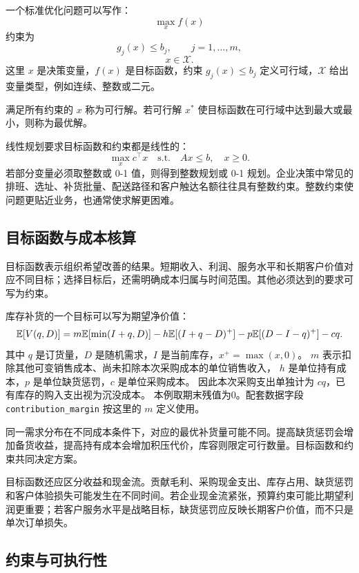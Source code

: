 一个标准优化问题可以写作：
\[
  \max_{x} f(x)
\]
约束为
\[
  g_j(x)\le b_j,\qquad j=1,\ldots,m,
\]
\[
  x\in\mathcal X.
\]
这里 \(x\) 是决策变量，\(f(x)\) 是目标函数，约束 \(g_j(x)\le b_j\) 定义可行域，\(\mathcal X\) 给出变量类型，例如连续、整数或二元。

\begin{definition}[可行解与最优解]
满足所有约束的 \(x\) 称为可行解。若可行解 \(x^*\) 使目标函数在可行域中达到最大或最小，则称为最优解。
\end{definition}

线性规划要求目标函数和约束都是线性的：
\[
  \max_x c^\top x
  \quad
  \text{s.t.}
  \quad
  Ax\le b,\quad x\ge 0.
\]
若部分变量必须取整数或 0-1 值，则得到整数规划或 0-1 规划。企业决策中常见的排班、选址、补货批量、配送路径和客户触达名额往往具有整数约束。整数约束使问题更贴近业务，也通常使求解更困难。

\subsection{目标函数与成本核算}

目标函数表示组织希望改善的结果。短期收入、利润、服务水平和长期客户价值对应不同目标；选择目标后，还需明确成本归属与时间范围。其他必须达到的要求可写为约束。

库存补货的一个目标可以写为期望净价值：
\[
  \mathbb E[V(q,D)]
  =
  m\mathbb E[\min(I+q,D)]
  -
  h\mathbb E[(I+q-D)^+]
  -
  p\mathbb E[(D-I-q)^+]
  -
  cq.
\]
其中 \(q\) 是订货量，\(D\) 是随机需求，\(I\) 是当前库存，\(x^+=\max(x,0)\)。
\(m\) 表示扣除其他可变销售成本、尚未扣除本次采购成本的单位销售收入，
\(h\) 是单位持有成本，\(p\) 是单位缺货惩罚，\(c\) 是单位采购成本。
因此本次采购支出单独计为 \(cq\)，已有库存的购入支出视为沉没成本。
本例取期末残值为0。配套数据字段 \texttt{contribution\_margin} 按这里的 \(m\) 定义使用。

\begin{modernbox}[管理解释]
同一需求分布在不同成本条件下，对应的最优补货量可能不同。提高缺货惩罚会增加备货收益，提高持有成本会增加积压代价，库容则限定可行数量。目标函数和约束共同决定方案。
\end{modernbox}

目标函数还应区分收益和现金流。贡献毛利、采购现金支出、库存占用、缺货惩罚和客户体验损失可能发生在不同时间。若企业现金流紧张，预算约束可能比期望利润更重要；若客户服务水平是战略目标，缺货惩罚应反映长期客户价值，而不只是单次订单损失。

\subsection{约束与可执行性}

